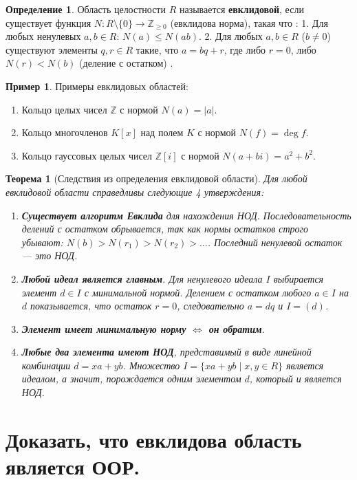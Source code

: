 \documentclass[12pt, a4paper]{article}
\theoremstyle{definition}
\newtheorem{definition}{Определение}[section]
\newtheorem{example}{Пример}[section]
\theoremstyle{plain}
\newtheorem{theorem}{Теорема}[section]
\begin{document}
	\begin{definition}
		Область целостности $R$ называется \textbf{евклидовой}, если существует функция $N: R \setminus \{0\} \to \mathbb{Z}_{\ge 0}$ (евклидова норма), такая что :
		1. Для любых ненулевых $a,b \in R$: $N(a) \le N(ab)$.
		2. Для любых $a, b \in R$ ($b \neq 0$) существуют элементы $q, r \in R$ такие, что $a = bq + r$, где либо $r=0$, либо $N(r) < N(b)$ (деление с остатком) .
	\end{definition}
	
	\begin{example}Примеры евклидовых областей:
		\begin{enumerate}
			\item Кольцо целых чисел $\mathbb{Z}$ с нормой $N(a) = |a|$.
			\item Кольцо многочленов $K[x]$ над полем $K$ с нормой $N(f) = \deg f$.
			\item Кольцо гауссовых целых чисел $\mathbb{Z}[i]$ с нормой $N(a+bi) = a^2+b^2$.
		\end{enumerate}
	\end{example}
	
	\begin{theorem}[Следствия из определения евклидовой области]
		Для любой евклидовой области справедливы следующие 4 утверждения:
		\begin{enumerate}
			\item \textbf{Существует алгоритм Евклида} для нахождения НОД. Последовательность делений с остатком обрывается, так как нормы остатков строго убывают: $N(b) > N(r_1) > N(r_2) > \dots$. Последний ненулевой остаток — это НОД.
			\item \textbf{Любой идеал является главным}. Для ненулевого идеала $I$ выбирается элемент $d \in I$ с минимальной нормой. Делением с остатком любого $a \in I$ на $d$ показывается, что остаток $r=0$, следовательно $a=dq$ и $I=(d)$.
			\item \textbf{Элемент имеет минимальную норму $\iff$ он обратим}.
			\item \textbf{Любые два элемента имеют НОД}, представимый в виде линейной комбинации $d = xa+yb$. Множество $I = \{xa+yb \mid x,y \in R\}$ является идеалом, а значит, порождается одним элементом $d$, который и является НОД.
		\end{enumerate}
	\end{theorem}
	
	\newpage
	\section{Доказать, что евклидова область является ООР.}
	
\end{document}
